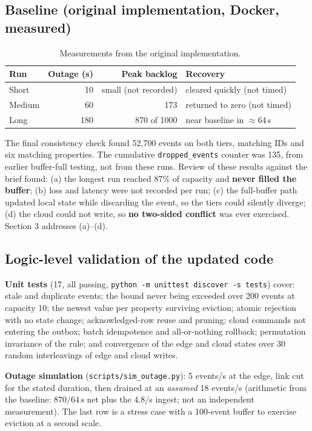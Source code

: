 \documentclass[11pt,a4paper]{article}
\begin{document}
\subsection{Baseline (original implementation, Docker, measured)}\label{sec:baseline}
\begin{table}[H]\centering\small
\caption{Measurements from the original implementation.}
\begin{tabularx}{\textwidth}{lrrX}
\toprule
Run & Outage (s) & Peak backlog & Recovery\\\midrule
Short & 10 & small (not recorded) & cleared quickly (not timed)\\
Medium & 60 & 173 & returned to zero (not timed)\\
Long & 180 & 870 of 1000 & near baseline in $\approx$64\,s\\\bottomrule
\end{tabularx}
\end{table}
The final consistency check found 52{,}700 events on both tiers, matching IDs and six matching properties.
The cumulative \texttt{dropped\_events} counter was 135, from earlier buffer-full testing, not from these runs.
Review of these results against the brief found:
(a) the longest run reached 87\% of capacity and \textbf{never filled the buffer};
(b) loss and latency were not recorded per run;
(c) the full-buffer path updated local state while discarding the event, so the tiers could silently diverge;
(d) the cloud could not write, so \textbf{no two-sided conflict} was ever exercised. Section 3 addresses (a)--(d).

\subsection{Logic-level validation of the updated code}\label{sec:sim}
\textbf{Unit tests} (17, all passing, \texttt{python -m unittest discover -s tests}) cover: stale and
duplicate events; the bound never being exceeded over 200 events at capacity 10; the newest value per property
surviving eviction; atomic rejection with no state change; acknowledged-row reuse and pruning;
cloud commands not entering the outbox; batch idempotence and all-or-nothing rollback; permutation
invariance of the rule; and convergence of the edge and cloud states over 30 random interleavings of
edge and cloud writes.

\textbf{Outage simulation} (\texttt{scripts/sim\_outage.py}): 5 events/s at the edge, link cut for the stated
duration, then drained at an \emph{assumed} 18 events/s (arithmetic from the baseline: $870/64\,\mathrm{s}$
net plus the 4.8/s ingest; not an independent measurement). The last row is a stress case with a 100-event
buffer to exercise eviction at a second scale.
\end{document}
